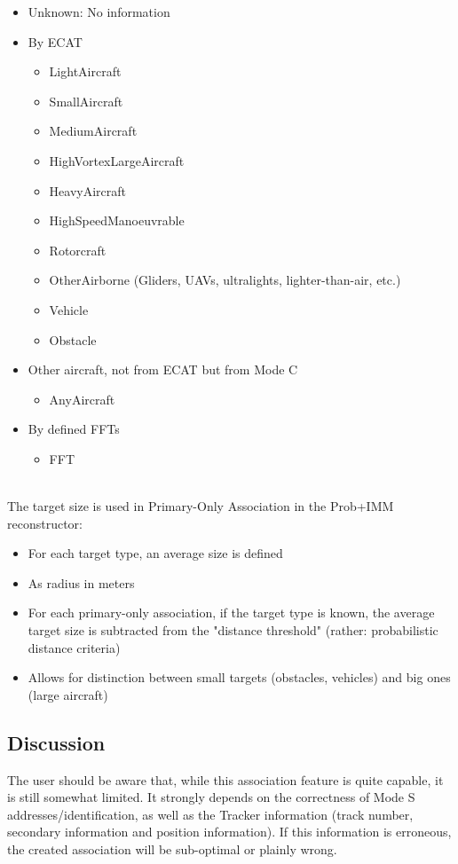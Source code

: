 \begin{itemize}
\item Unknown: No information
\item By ECAT
\begin{itemize}
\item LightAircraft
\item SmallAircraft
\item MediumAircraft
\item HighVortexLargeAircraft
\item HeavyAircraft
\item HighSpeedManoeuvrable
\item Rotorcraft
\item OtherAirborne (Gliders, UAVs, ultralights, lighter-than-air, etc.)
\item Vehicle
\item Obstacle
\end{itemize}
\item Other aircraft, not from ECAT but from Mode C
\begin{itemize}
\item AnyAircraft
\end{itemize}
\item By defined FFTs
\begin{itemize}
\item FFT
\end{itemize}
\end{itemize}
\ \\

The target size is used in Primary-Only Association in the Prob+IMM reconstructor:

\begin{itemize}
\item For each target type, an average size is defined
\item As radius in meters
\item For each primary-only association, if the target type is known, the average target size is subtracted from the "distance threshold" (rather: probabilistic distance criteria)
\item Allows for distinction between small targets (obstacles, vehicles) and big ones (large aircraft)
\end{itemize}

\subsection{Discussion}

The user should be aware that, while this association feature is quite capable, it is still somewhat limited. 
It strongly depends on the correctness of Mode S addresses/identification, as well as the Tracker information (track number, secondary information and position information). 
If this information is erroneous, the created association will be sub-optimal or plainly wrong. \\

